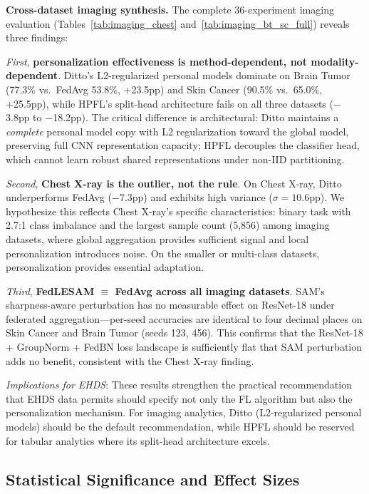 \documentclass[conference]{IEEEtran}
\begin{document}
\textbf{Cross-dataset imaging synthesis.} The complete 36-experiment imaging evaluation (Tables~\ref{tab:imaging_chest} and~\ref{tab:imaging_bt_sc_full}) reveals three findings:

\textit{First}, \textbf{personalization effectiveness is method-dependent, not modality-dependent}. Ditto's L2-regularized personal models dominate on Brain Tumor (77.3\% vs.\ FedAvg 53.8\%, +23.5pp) and Skin Cancer (90.5\% vs.\ 65.0\%, +25.5pp), while HPFL's split-head architecture fails on all three datasets ($-$3.8pp to $-$18.2pp). The critical difference is architectural: Ditto maintains a \textit{complete} personal model copy with L2 regularization toward the global model, preserving full CNN representation capacity; HPFL decouples the classifier head, which cannot learn robust shared representations under non-IID partitioning.

\textit{Second}, \textbf{Chest X-ray is the outlier, not the rule}. On Chest X-ray, Ditto underperforms FedAvg ($-$7.3pp) and exhibits high variance ($\sigma{=}10.6$pp). We hypothesize this reflects Chest X-ray's specific characteristics: binary task with 2.7:1 class imbalance and the largest sample count (5,856) among imaging datasets, where global aggregation provides sufficient signal and local personalization introduces noise. On the smaller or multi-class datasets, personalization provides essential adaptation.

\textit{Third}, \textbf{FedLESAM $\equiv$ FedAvg across all imaging datasets}. SAM's sharpness-aware perturbation has no measurable effect on ResNet-18 under federated aggregation---per-seed accuracies are identical to four decimal places on Skin Cancer and Brain Tumor (seeds 123, 456). This confirms that the ResNet-18 + GroupNorm + FedBN loss landscape is sufficiently flat that SAM perturbation adds no benefit, consistent with the Chest X-ray finding.

\textit{Implications for EHDS}: These results strengthen the practical recommendation that EHDS data permits should specify not only the FL algorithm but also the personalization mechanism. For imaging analytics, Ditto (L2-regularized personal models) should be the default recommendation, while HPFL should be reserved for tabular analytics where its split-head architecture excels.


\subsection{Statistical Significance and Effect Sizes}
\label{sec:imaging_stats}
\end{document}
